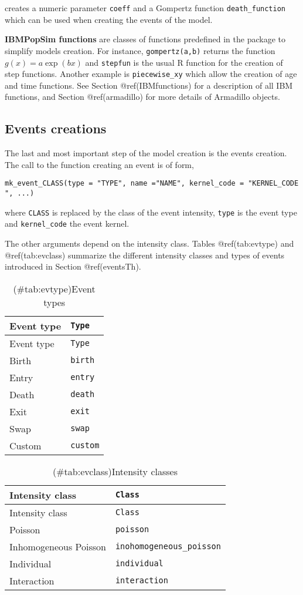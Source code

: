 creates a numeric parameter \texttt{coeff} and a Gompertz function \texttt{death\_function} which can be used when creating the events of the model.

\textbf{IBMPopSim functions} are classes of functions predefined in the package to simplify models creation. For instance, \texttt{gompertz(a,b)} returns the function \(g(x) = a \exp(bx)\)
and \texttt{stepfun} is the usual R function for the creation of step functions. Another example is \texttt{piecewise\_xy} which allow the creation of age and time functions. See Section @ref(IBMfunctions) for a description of all IBM functions, and Section @ref(armadillo) for more details of Armadillo objects.

\hypertarget{events}{%
\subsection{Events creations}\label{events}}

The last and most important step of the model creation is the events creation. The call to the function creating an event is of form,

\texttt{mk\_event\_CLASS(type\ =\ "TYPE",\ name\ ="NAME",\ kernel\_code\ =\ "KERNEL\_CODE",\ ...)}

where \texttt{CLASS} is replaced by the class of the event intensity, \texttt{type} is the event type and \texttt{kernel\_code} the event kernel.

The other arguments depend on the intensity class. Tables @ref(tab:evtype) and @ref(tab:evclass) summarize the different intensity classes and types of events introduced in Section @ref(eventsTh).

\begin{longtable}[]{@{}ll@{}}
\caption{(\#tab:evtype)Event types}\tabularnewline
\toprule
Event type & \texttt{Type}\tabularnewline
\midrule
\endfirsthead
\toprule
Event type & \texttt{Type}\tabularnewline
\midrule
\endhead
Birth & \texttt{birth}\tabularnewline
Entry & \texttt{entry}\tabularnewline
Death & \texttt{death}\tabularnewline
Exit & \texttt{exit}\tabularnewline
Swap & \texttt{swap}\tabularnewline
Custom & \texttt{custom}\tabularnewline
\bottomrule
\end{longtable}

\begin{longtable}[]{@{}ll@{}}
\caption{(\#tab:evclass)Intensity classes}\tabularnewline
\toprule
Intensity class & \texttt{Class}\tabularnewline
\midrule
\endfirsthead
\toprule
Intensity class & \texttt{Class}\tabularnewline
\midrule
\endhead
Poisson & \texttt{poisson}\tabularnewline
Inhomogeneous Poisson & \texttt{inohomogeneous\_poisson}\tabularnewline
Individual & \texttt{individual}\tabularnewline
Interaction & \texttt{interaction}\tabularnewline
\bottomrule
\end{longtable}

